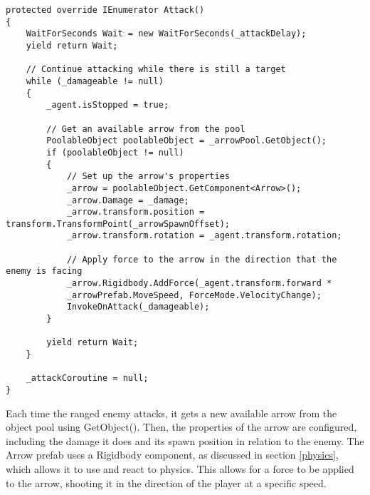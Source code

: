 \documentclass[10pt]{final_report}
\begin{document}
\begin{verbatim}
protected override IEnumerator Attack()
{
    WaitForSeconds Wait = new WaitForSeconds(_attackDelay);
    yield return Wait;

    // Continue attacking while there is still a target
    while (_damageable != null)
    {
        _agent.isStopped = true;

        // Get an available arrow from the pool
        PoolableObject poolableObject = _arrowPool.GetObject();
        if (poolableObject != null)
        {
            // Set up the arrow's properties
            _arrow = poolableObject.GetComponent<Arrow>();
            _arrow.Damage = _damage;
            _arrow.transform.position = transform.TransformPoint(_arrowSpawnOffset);
            _arrow.transform.rotation = _agent.transform.rotation;

            // Apply force to the arrow in the direction that the enemy is facing
            _arrow.Rigidbody.AddForce(_agent.transform.forward * 
			_arrowPrefab.MoveSpeed, ForceMode.VelocityChange);
            InvokeOnAttack(_damageable);
        }
            
        yield return Wait;
    }

    _attackCoroutine = null;
}
\end{verbatim}
Each time the ranged enemy attacks, it gets a new available arrow from the object pool using GetObject(). Then, the properties of the arrow are configured, including the damage it does and its spawn position in relation to the enemy. The Arrow prefab uses a Rigidbody component, as discussed in section \ref{physics}, which allows it to use and react to physics. This allows for a force to be applied to the arrow, shooting it in the direction of the player at a specific speed. 

\end{document}
